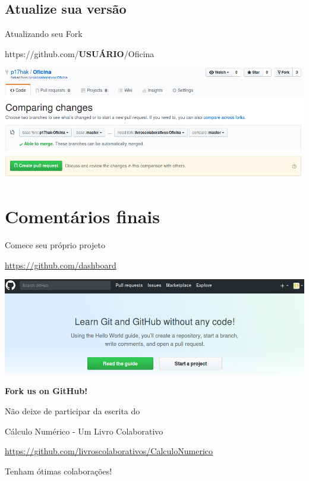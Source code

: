 \documentclass{beamer}
\begin{document}
\subsection{Atualize sua versão}
\begin{frame}{Atualizando seu Fork}
  \begin{center}
    https://github.com/{\bf USUÁRIO}/Oficina

    \includegraphics[scale=0.3]{./figs/Sync_GitHub.png}
  \end{center}
\end{frame}

\section{Comentários finais}
\begin{frame}{Comece seu próprio projeto}
  \begin{center}
    \url{https://github.com/dashboard}
    
    \includegraphics[scale=0.3]{./figs/Start_a_project_GitHub.png}
  \end{center}
\end{frame}

\begin{frame}{{\bf Fork us on GitHub!}}
  \begin{center}
    Não deixe de participar da escrita do

    {\Large Cálculo Numérico - Um Livro Colaborativo}

    \url{https://github.com/livroscolaborativos/CalculoNumerico}
  \end{center}
  \vspace{1cm}
  \begin{center}
    {\Huge Tenham ótimas colaborações!}
  \end{center}
\end{frame}
\end{document}

